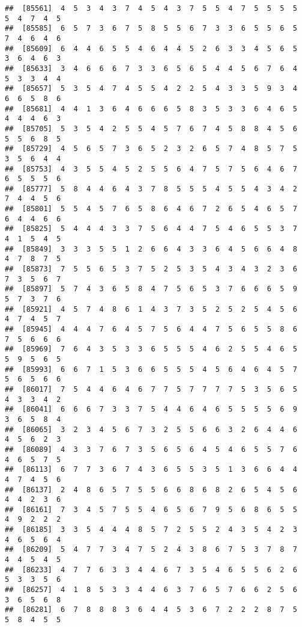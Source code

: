 \documentclass[
]{book}
\begin{document}
\begin{verbatim}
##  [85561]  4  5  3  4  3  7  4  5  4  3  7  5  5  4  7  5  5  5  5  5  4  7  4  5
##  [85585]  6  5  7  3  6  7  5  8  5  5  6  7  3  3  6  5  5  6  5  7  4  6  4  6
##  [85609]  6  4  4  6  5  5  4  6  4  4  5  2  6  3  3  4  5  6  5  3  6  4  6  3
##  [85633]  3  4  6  6  6  7  3  3  6  5  6  5  4  4  5  6  7  6  4  5  3  3  4  4
##  [85657]  5  3  5  4  7  4  5  5  4  2  2  5  4  3  3  5  9  3  4  6  6  5  8  6
##  [85681]  4  4  1  3  6  4  6  6  6  5  8  3  5  3  3  6  4  6  5  4  4  4  6  3
##  [85705]  5  3  5  4  2  5  5  4  5  7  6  7  4  5  8  8  4  5  6  5  5  6  8  5
##  [85729]  4  5  6  5  7  3  6  5  2  3  2  6  5  7  4  8  5  7  5  3  5  6  4  4
##  [85753]  4  3  5  5  4  5  2  5  5  6  4  7  5  7  5  6  4  6  7  6  5  5  5  6
##  [85777]  5  8  4  4  6  4  3  7  8  5  5  5  4  5  5  4  3  4  2  7  4  4  5  6
##  [85801]  5  5  4  5  7  6  5  8  6  4  6  7  2  6  5  4  6  5  7  6  4  4  6  6
##  [85825]  5  4  4  4  3  3  7  5  6  4  4  7  5  4  6  5  5  3  7  4  1  5  4  5
##  [85849]  3  3  3  5  5  1  2  6  6  4  3  3  6  4  5  6  6  4  8  4  7  8  7  5
##  [85873]  7  5  5  6  5  3  7  5  2  5  3  5  4  3  4  3  2  3  6  7  3  5  6  7
##  [85897]  5  7  4  3  6  5  8  4  7  5  6  5  3  7  6  6  6  5  9  5  7  3  7  6
##  [85921]  4  5  7  4  8  6  1  4  3  7  3  5  2  5  2  5  4  5  6  4  7  4  5  7
##  [85945]  4  4  4  7  6  4  5  7  5  6  4  4  7  5  6  5  5  8  6  7  5  6  6  6
##  [85969]  7  6  4  3  5  3  3  6  5  5  5  4  6  2  5  5  4  6  5  5  9  5  6  5
##  [85993]  6  6  7  1  5  3  6  6  5  5  5  4  5  6  4  6  4  5  7  5  6  5  6  6
##  [86017]  7  5  4  4  6  4  6  7  7  5  7  7  7  7  5  3  5  6  5  4  3  3  4  2
##  [86041]  6  6  6  7  3  3  7  5  4  4  6  4  6  5  5  5  5  6  9  3  6  5  8  4
##  [86065]  3  2  3  4  5  6  7  3  2  5  5  6  6  3  2  6  4  4  6  4  5  6  2  3
##  [86089]  4  3  3  7  6  7  3  5  6  5  6  4  5  4  6  5  5  7  6  4  6  5  7  5
##  [86113]  6  7  7  3  6  7  4  3  6  5  5  3  5  1  3  6  6  4  4  4  7  4  5  6
##  [86137]  2  4  8  6  5  7  5  5  6  6  8  6  8  2  6  5  4  5  6  4  4  2  3  6
##  [86161]  7  3  4  5  7  5  5  4  6  5  6  7  9  5  6  8  6  5  5  4  9  2  2  2
##  [86185]  3  3  5  4  4  4  8  5  7  2  5  5  2  4  3  5  4  2  3  4  6  5  6  4
##  [86209]  5  4  7  7  3  4  7  5  2  4  3  8  6  7  5  3  7  8  7  4  4  5  4  5
##  [86233]  4  7  7  6  3  3  4  4  6  7  3  5  4  6  5  5  6  2  6  5  3  3  5  6
##  [86257]  4  1  8  5  3  3  4  4  6  3  7  6  5  7  6  6  2  5  6  3  6  5  6  8
##  [86281]  6  7  8  8  8  3  6  4  4  5  3  6  7  2  2  2  8  7  5  5  8  4  5  5

\end{verbatim}
\end{document}
